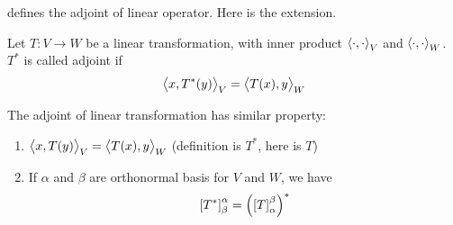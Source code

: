 \begin{definition}
     defines the adjoint of linear operator. Here is the extension.
    
    Let $T:V \rightarrow W$ be a linear transformation, with inner product $\left\langle \displaystyle \cdot, \cdot \right\rangle_V$ and $\left\langle \displaystyle \cdot, \cdot \right\rangle_W$. $T^*$ is called adjoint if 
    \begin{equation}
        \left\langle \displaystyle x, T^*(y) \right\rangle_V = \left\langle \displaystyle T(x), y \right\rangle_W
    \end{equation}
\end{definition}

The adjoint of linear transformation has similar property:
\begin{enumerate}
    \item $\left\langle \displaystyle x, T(y) \right\rangle_V = \left\langle \displaystyle T(x), y \right\rangle_W$ (definition is $T^*$, here is $T$)
    \item If $\alpha$ and $\beta$ are orthonormal basis for $V$ and $W$, we have \begin{equation}
        \coordinate{T^*}_\beta^\alpha = \left(\coordinate{T}_\alpha^\beta\right)^*
    \end{equation}
\end{enumerate}


